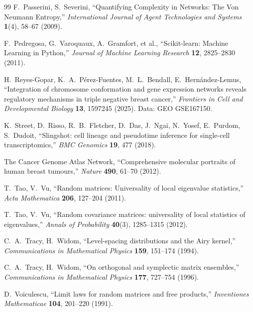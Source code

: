 \documentclass[11pt]{article}
\begin{document}
\begin{thebibliography}{99}
F.~Passerini, S.~Severini,
\newblock ``Quantifying Complexity in Networks: The Von Neumann Entropy,''
\newblock \emph{International Journal of Agent Technologies and Systems} \textbf{1}(4), 58--67 (2009).

F.~Pedregosa, G.~Varoquaux, A.~Gramfort, et al.,
\newblock ``Scikit-learn: Machine Learning in Python,''
\newblock \emph{Journal of Machine Learning Research} \textbf{12}, 2825--2830 (2011).

H.~Reyes-Gopar, K.~A.~P\'erez-Fuentes, M.~L.~Bendall, E.~Hern\'andez-Lemus,
\newblock ``Integration of chromosome conformation and gene expression networks reveals regulatory mechanisms in triple negative breast cancer,''
\newblock \emph{Frontiers in Cell and Developmental Biology} \textbf{13}, 1597245 (2025). Data: GEO GSE167150.

K.~Street, D.~Risso, R.~B.~Fletcher, D.~Das, J.~Ngai, N.~Yosef, E.~Purdom, S.~Dudoit,
\newblock ``Slingshot: cell lineage and pseudotime inference for single-cell transcriptomics,''
\newblock \emph{BMC Genomics} \textbf{19}, 477 (2018).

The Cancer Genome Atlas Network,
\newblock ``Comprehensive molecular portraits of human breast tumours,''
\newblock \emph{Nature} \textbf{490}, 61--70 (2012).

T.~Tao, V.~Vu,
\newblock ``Random matrices: Universality of local eigenvalue statistics,''
\newblock \emph{Acta Mathematica} \textbf{206}, 127--204 (2011).

T.~Tao, V.~Vu,
\newblock ``Random covariance matrices: universality of local statistics of eigenvalues,''
\newblock \emph{Annals of Probability} \textbf{40}(3), 1285--1315 (2012).

C.~A.~Tracy, H.~Widom,
\newblock ``Level-spacing distributions and the Airy kernel,''
\newblock \emph{Communications in Mathematical Physics} \textbf{159}, 151--174 (1994).

C.~A.~Tracy, H.~Widom,
\newblock ``On orthogonal and symplectic matrix ensembles,''
\newblock \emph{Communications in Mathematical Physics} \textbf{177}, 727--754 (1996).

D.~Voiculescu,
\newblock ``Limit laws for random matrices and free products,''
\newblock \emph{Inventiones Mathematicae} \textbf{104}, 201--220 (1991).


\end{thebibliography}
\end{document}
